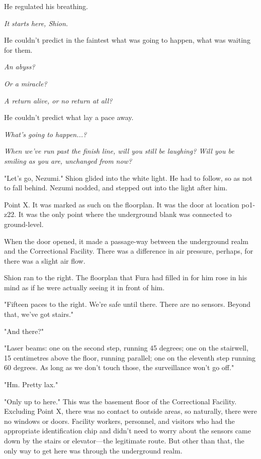 He regulated his breathing.

\emph{It starts here, Shion.}

He couldn't predict in the faintest what was going to happen, what was
waiting for them.

\emph{An abyss?}

\emph{Or a miracle?}

\emph{A return alive, or no return at all?}

He couldn't predict what lay a pace away.

\emph{What's going to happen...?}

\emph{When we've run past the finish line, will you still be laughing? Will
you be smiling as you are, unchanged from now?}

"Let's go, Nezumi." Shion glided into the white light. He had to follow,
so as not to fall behind. Nezumi nodded, and stepped out into the light
after him.

Point X. It was marked as such on the floorplan. It was the door at
location po1-z22. It was the only point where the underground blank was
connected to ground-level.

When the door opened, it made a passage-way between the underground
realm and the Correctional Facility. There was a difference in air
pressure, perhaps, for there was a slight air flow.

Shion ran to the right. The floorplan that Fura had filled in for him
rose in his mind as if he were actually seeing it in front of him.

"Fifteen paces to the right. We're safe until there. There are no
sensors. Beyond that, we've got stairs."

"And there?"

"Laser beams: one on the second step, running 45 degrees; one on the
stairwell, 15 centimetres above the floor, running parallel; one on the
eleventh step running 60 degrees. As long as we don't touch those, the
surveillance won't go off."

"Hm. Pretty lax."

"Only up to here." This was the basement floor of the Correctional
Facility. Excluding Point X, there was no contact to outside areas, so
naturally, there were no windows or doors. Facility workers, personnel,
and visitors who had the appropriate identification chip and didn't need
to worry about the sensors came down by the stairs or elevator---the
legitimate route. But other than that, the only way to get here was
through the underground realm.

